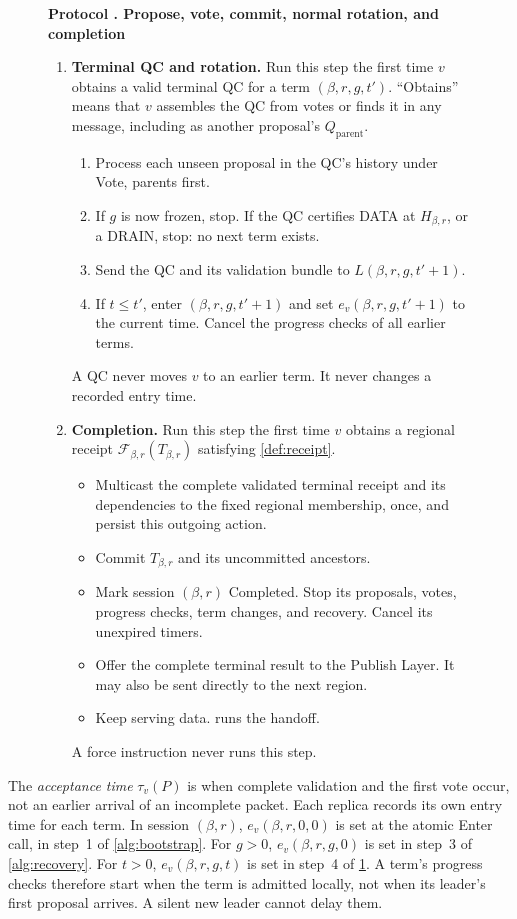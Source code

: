 \documentclass[11pt,a4paper]{article}
\newcommand{\RR}[1]{{\color{rrRed}#1}}
\newcommand{\FC}{\mathcal F}
\newcommand{\defterm}[1]{\textcolor{rrBlue}{\textit{#1}}}
\newcounter{protocol}
\newenvironment{protocol}[3][htbp]{\begin{figure}[#1]\refstepcounter{protocol}\label{#2}
\begin{mdframed}[linewidth=.6pt,skipabove=0pt,skipbelow=0pt,
innertopmargin=7pt,innerbottommargin=7pt]\small
\textbf{Protocol \theprotocol. #3}\par\smallskip}{\end{mdframed}\end{figure}}
\begin{document}
\begin{protocol}{alg:steady}{Propose, vote, commit, normal rotation\RR{, and completion}}
\begin{enumerate}[label=\textbf{\arabic*)},itemsep=3pt]
\item \textbf{Terminal QC and rotation.} Run this step the first time
$v$ obtains a valid terminal QC for a term $(\beta,r,g,t')$.
``Obtains'' means that $v$ assembles the QC from votes or finds it in
any message, including as another proposal's $Q_{\mathrm{parent}}$.
 \begin{enumerate}[label=(\alph*)]
 \item Process each unseen proposal in the QC's history under Vote,
       parents first.
 \item If $g$ is now frozen, stop. \RR{If the QC certifies DATA at
       $H_{\beta,r}$, or a DRAIN, stop: no next term exists.}
 \item Send the QC and its validation bundle to $L(\beta,r,g,t'+1)$.
 \item If $t\le t'$, enter $(\beta,r,g,t'+1)$ and set $e_v(\beta,r,g,t'+1)$ to the
       current time. Cancel the progress checks of all earlier
       terms.
 \end{enumerate}
 A QC never moves $v$ to an earlier term. It never changes a recorded
 entry time.

\item \RR{\textbf{Completion.} Run this step the first time $v$ obtains a
regional receipt $\FC_{\beta,r}(T_{\beta,r})$ satisfying \cref{def:receipt}.}
 \begin{itemize}\color{rrRed}
 \item Multicast the complete validated terminal receipt and its dependencies
       to the fixed regional membership, once, and persist this outgoing action.
 \item Commit $T_{\beta,r}$ and its uncommitted ancestors.
 \item Mark session $(\beta,r)$ Completed. Stop its proposals, votes, progress
       checks, term changes, and recovery. Cancel its unexpired timers.
 \item Offer the complete terminal result to the Publish Layer.
       It may also be sent directly to the next region.
 \item Keep serving data.  runs the handoff.
 \end{itemize}
 \RR{A force instruction never runs this step.}
\end{enumerate}
\end{protocol}

The \defterm{acceptance time} $\tau_v(P)$ is when complete validation and the first
vote occur, not an earlier arrival of an incomplete packet. Each replica
records its own entry time for each term. In session $(\beta,r)$, $e_v(\beta,r,0,0)$ is
set at the atomic Enter call, in step~1 of \cref{alg:bootstrap}. For $g>0$, $e_v(\beta,r,g,0)$ is
set in step~3 of \cref{alg:recovery}. For $t>0$, $e_v(\beta,r,g,t)$ is set in
step~4 of \cref{alg:steady}. A term's progress checks therefore start
when the term is admitted locally, not when its leader's first proposal
arrives. A silent new leader cannot delay them.
\end{document}
